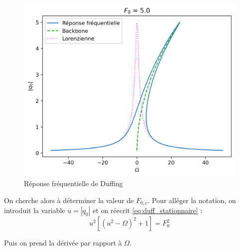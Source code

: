 \begin{figure}[!b]
\begin{subcaptionblock}{.31\linewidth}
      \includegraphics[width=\linewidth]{images/duffing/F0=5.0.png}
    \end{subcaptionblock}
    \caption{Réponse fréquentielle de Duffing}
\end{figure}
On cherche alors à déterminer la valeur de $F_{0, c}$. Pour alléger la notation, 
on introduit la variable $u = |q_0|$ et on réecrit \eqref{eq:duff_stationnaire} :
\begin{equation}
    u^2[(u^2 - \Omega)^2 + 1] = F_0^2
    \label{eq:duff_stationnaire_u}
\end{equation}

Puis on prend la dérivée par rapport à $\Omega$.

